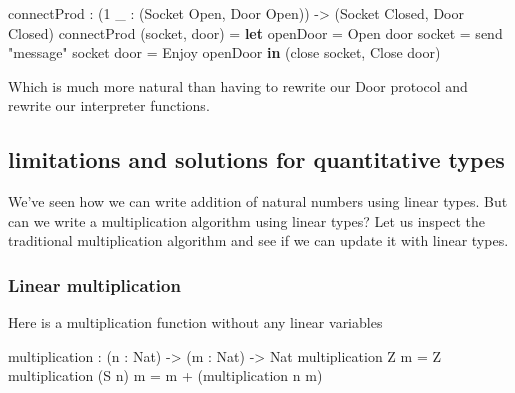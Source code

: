 \documentclass[
]{article}
\newenvironment{Shaded}{}{}
\newcommand{\DataTypeTok}[1]{\textcolor[rgb]{0.56,0.13,0.00}{#1}}
\newcommand{\DecValTok}[1]{\textcolor[rgb]{0.25,0.63,0.44}{#1}}
\newcommand{\KeywordTok}[1]{\textcolor[rgb]{0.00,0.44,0.13}{\textbf{#1}}}
\newcommand{\NormalTok}[1]{#1}
\newcommand{\OperatorTok}[1]{\textcolor[rgb]{0.40,0.40,0.40}{#1}}
\newcommand{\OtherTok}[1]{\textcolor[rgb]{0.00,0.44,0.13}{#1}}
\newcommand{\StringTok}[1]{\textcolor[rgb]{0.25,0.44,0.63}{#1}}
\begin{document}
\begin{Shaded}
\begin{Highlighting}[]
\NormalTok{connectProd }\OperatorTok{:}\NormalTok{ (}\DecValTok{1}\NormalTok{ \_ }\OperatorTok{:}\NormalTok{ (}\DataTypeTok{Socket} \DataTypeTok{Open}\NormalTok{, }\DataTypeTok{Door} \DataTypeTok{Open}\NormalTok{)) }
           \OtherTok{{-}\textgreater{}}\NormalTok{ (}\DataTypeTok{Socket} \DataTypeTok{Closed}\NormalTok{, }\DataTypeTok{Door} \DataTypeTok{Closed}\NormalTok{)}
\NormalTok{connectProd (socket, door) }\OtherTok{=} 
  \KeywordTok{let}\NormalTok{ openDoor }\OtherTok{=} \DataTypeTok{Open}\NormalTok{ door}
\NormalTok{      socket\textquotesingle{} }\OtherTok{=}\NormalTok{ send }\StringTok{"message"}\NormalTok{ socket}
\NormalTok{      door\textquotesingle{} }\OtherTok{=} \DataTypeTok{Enjoy}\NormalTok{ openDoor }\KeywordTok{in}
\NormalTok{      (close socket\textquotesingle{}, }\DataTypeTok{Close}\NormalTok{ door\textquotesingle{})}
\end{Highlighting}
\end{Shaded}

Which is much more natural than having to rewrite our Door protocol and
rewrite our interpreter functions.

\hypertarget{limitations-and-solutions-for-quantitative-types}{%
\subsection{limitations and solutions for quantitative
types}\label{limitations-and-solutions-for-quantitative-types}}

We've seen how we can write addition of natural numbers using linear
types. But can we write a multiplication algorithm using linear types?
Let us inspect the traditional multiplication algorithm and see if we
can update it with linear types.

\hypertarget{linear-multiplication}{%
\subsubsection{Linear multiplication}\label{linear-multiplication}}

Here is a multiplication function without any linear variables

\begin{Shaded}
\begin{Highlighting}[]
\NormalTok{multiplication }\OperatorTok{:}\NormalTok{ (n }\OperatorTok{:} \DataTypeTok{Nat}\NormalTok{) }\OtherTok{{-}\textgreater{}}\NormalTok{ (m }\OperatorTok{:} \DataTypeTok{Nat}\NormalTok{) }\OtherTok{{-}\textgreater{}} \DataTypeTok{Nat}
\NormalTok{multiplication }\DataTypeTok{Z}\NormalTok{ m }\OtherTok{=} \DataTypeTok{Z} 
\NormalTok{multiplication (}\DataTypeTok{S}\NormalTok{ n) m }\OtherTok{=}\NormalTok{ m }\OperatorTok{+}\NormalTok{ (multiplication n m)}
\end{Highlighting}
\end{Shaded}
\end{document}
